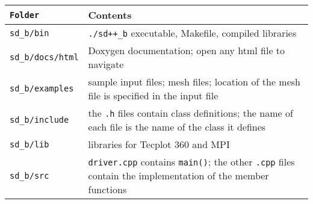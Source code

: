 \documentclass[letter,10pt]{article}
\newcommand*{\TitleFont}{%
      \usefont{\encodingdefault}{\rmdefault}{b}{n}%
      \fontsize{10}{20}%
      \selectfont}
\begin{document}
\section*{\TitleFont{Contents of folders in sd++}}
\begin{tabular}{p{4cm} p{12cm}}
 \texttt{{\bf \centering Folder}} & {\bf  Contents}\\
 \hline \texttt{sd\_b/bin} & \texttt{./sd++\_b} executable, Makefile, compiled libraries \\
\hline \texttt{sd\_b/docs/html} & Doxygen documentation; open any html file to navigate\\
 \hline \texttt{sd\_b/examples} & sample input files; mesh files; location of the mesh file is
specified in the input file\\
\hline \texttt{sd\_b/include} & the \texttt{.h} files contain class definitions; the name of each
file is the name of the class it defines \\
\hline \texttt{sd\_b/lib} & libraries for Tecplot 360 and MPI \\
\hline \texttt{sd\_b/src} & \texttt{driver.cpp} contains \texttt{main()}; the other \texttt{.cpp}
files contain the implementation of the member functions
\end{tabular}
\end{document}
